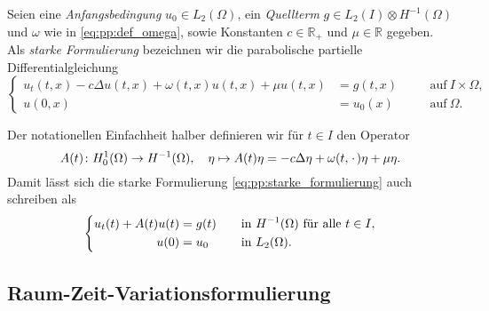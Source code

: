 \begin{Definition}
\label{definition:pp:starke_formulierung}
    Seien eine \emph{Anfangsbedingung} $u_{0} \in L_{2}(\Omega)$, ein \emph{Quellterm} $g \in L_{2}(I) \otimes H^{-1}(\Omega)$ und $\omega$ wie in \eqref{eq:pp:def_omega}, sowie Konstanten $c \in \mathbb{R}_{+}$ und $\mu \in \mathbb{R}$ gegeben.
    Als \emph{starke Formulierung} bezeichnen wir die parabolische partielle Differentialgleichung
    \begin{equation}
    \label{eq:pp:starke_formulierung}
        \left\{
        \begin{aligned}
            u_{t}(t, x) - c \Delta u(t, x) + \omega(t, x) u(t, x) + \mu u(t, x) &= g(t, x) \quad &&\text{auf}~I \times \Omega,\\
            u(0, x) &= u_{0}(x) \quad &&\text{auf}~\Omega.
        \end{aligned}
        \right.
    \end{equation}
\end{Definition}

\begin{Bemerkung}
\label{bemerkung:pp:definition_operator_A}
    Der notationellen Einfachheit halber definieren wir für $t \in I$ den Operator
    \begin{equation}
    \label{eq:pp:definition_operator_A}
        A(t) \colon H^{1}_{0}(\Omega) \to H^{-1}(\Omega), \quad \eta \mapsto A(t) \eta = - c \Delta \eta + \omega(t, \blank) \eta + \mu \eta.
    \end{equation}
    Damit lässt sich die starke Formulierung \eqref{eq:pp:starke_formulierung} auch schreiben als
    \begin{equation}
        \left\{
        \begin{aligned}
            u_t(t) + A(t)u(t) &= g(t) \quad &&\text{in}~H^{-1}(\Omega)~\fa t \in I,\\
            u(0) &= u_{0} \quad &&\text{in}~L_{2}(\Omega).
        \end{aligned}
        \right.
    \end{equation}
\end{Bemerkung}

\subsection{Raum-Zeit-Variationsformulierung} %
\label{sub:variationsformulierungen}


